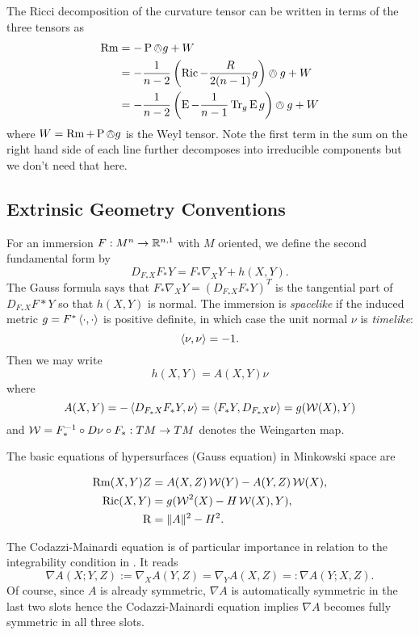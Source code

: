 \documentclass[a4paper, 12pt]{amsart}
\begin{document}
The Ricci decomposition of the curvature tensor can be written in terms of the three tensors as
\begin{align*}
\operatorname{Rm} &= -\operatorname{P} \owedge g + W \\
&= -\frac{1}{n-2} \left(\operatorname{Ric} - \frac{R}{2(n-1)} g\right) \owedge g + W \\
&= -\frac{1}{n-2} \left(\operatorname{E}  -\frac{1}{n-1} \operatorname{Tr}_g \operatorname{E} g\right) \owedge g + W
\end{align*}
where \(W = \operatorname{Rm} + \operatorname{P} \owedge g\) is the Weyl tensor. Note the first term in the sum on the right hand side of each line further decomposes into irreducible components but we don't need that here.

\subsection{Extrinsic Geometry Conventions}
\label{subsec:notation_extrinsic}

For an immersion \(F : M^n \to \mathbb{R}^{n,1}\) with \(M\) oriented, we define the second fundamental form by
\[
D_{F_{\ast} X} F_{\ast} Y = F_{\ast} \nabla_X Y + h(X, Y).
\]
The Gauss formula says that \(F_{\ast} \nabla_X Y = (D_{F_{\ast} X} F_{\ast} Y)^T\) is the tangential part of \(D_{F_{\ast} X} F{\ast} Y\) so that \(h(X, Y)\) is normal. The immersion is \emph{spacelike} if the induced metric \(g = F^{\ast} \left\langle \cdot,\cdot \right\rangle\) is positive definite, in which case the unit normal \(\nu\) is \emph{timelike}:
\[
\left\langle \nu,\nu \right\rangle = -1.
\]
Then we may write
\[
h(X, Y) = A(X, Y) \nu
\]
where
\[
A(X, Y) = -\left\langle D_{F_{\ast} X} F_{\ast} Y,\nu \right\rangle = \left\langle F_{\ast} Y,D_{F_{\ast} X} \nu \right\rangle = g(\operatorname{\mathcal{W}}(X), Y)
\]
and \(\operatorname{\mathcal{W}} = F_{\ast}^{-1} \circ D\nu \circ F_{\ast}: TM \to TM\) denotes the Weingarten map.

The basic equations of hypersurfaces (Gauss equation) in Minkowski space are

\begin{equation}
\label{eq:gauss}
\begin{split}
\operatorname{Rm}(X, Y) Z &= A(X, Z) \operatorname{\mathcal{W}}(Y) - A(Y, Z) \operatorname{\mathcal{W}}(X), \\
\operatorname{Ric}(X, Y) &= g(\operatorname{\mathcal{W}}^2(X) - H \operatorname{\mathcal{W}}(X), Y), \\
\operatorname{R} &= \|A\|^2 - H^2.
\end{split}
\end{equation}

The Codazzi-Mainardi equation is of particular importance in relation to the integrability condition in . It reads
\begin{equation}
\label{eq:codazzi}
\nabla A (X; Y, Z) := \nabla_X A (Y, Z) = \nabla_Y A(X, Z) =: \nabla A(Y; X, Z).
\end{equation}
Of course, since \(A\) is already symmetric, \(\nabla A\) is automatically symmetric in the last two slots hence the Codazzi-Mainardi equation implies \(\nabla A\) becomes fully symmetric in all three slots.
\end{document}
